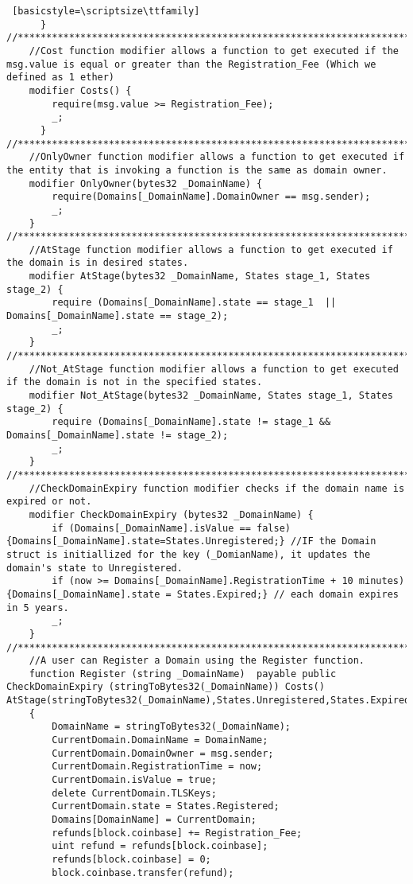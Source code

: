 \begin{lstlisting} [basicstyle=\scriptsize\ttfamily]
      }
//************************************************************************************************************************//
    //Cost function modifier allows a function to get executed if the msg.value is equal or greater than the Registration_Fee (Which we defined as 1 ether)
    modifier Costs() {
        require(msg.value >= Registration_Fee);
        _;
      }
//************************************************************************************************************************//
    //OnlyOwner function modifier allows a function to get executed if the entity that is invoking a function is the same as domain owner.
    modifier OnlyOwner(bytes32 _DomainName) {
        require(Domains[_DomainName].DomainOwner == msg.sender);
        _;
    }
//************************************************************************************************************************//
    //AtStage function modifier allows a function to get executed if the domain is in desired states.
    modifier AtStage(bytes32 _DomainName, States stage_1, States stage_2) {
        require (Domains[_DomainName].state == stage_1  || Domains[_DomainName].state == stage_2);
        _;
    }
//************************************************************************************************************************//
    //Not_AtStage function modifier allows a function to get executed if the domain is not in the specified states.
    modifier Not_AtStage(bytes32 _DomainName, States stage_1, States stage_2) {
        require (Domains[_DomainName].state != stage_1 && Domains[_DomainName].state != stage_2);
        _;
    }
//************************************************************************************************************************//
    //CheckDomainExpiry function modifier checks if the domain name is expired or not.
    modifier CheckDomainExpiry (bytes32 _DomainName) {
        if (Domains[_DomainName].isValue == false) {Domains[_DomainName].state=States.Unregistered;} //IF the Domain struct is initiallized for the key (_DomianName), it updates the domain's state to Unregistered.
        if (now >= Domains[_DomainName].RegistrationTime + 10 minutes) {Domains[_DomainName].state = States.Expired;} // each domain expires in 5 years.
        _;
    }
//************************************************************************************************************************//
    //A user can Register a Domain using the Register function.
    function Register (string _DomainName)  payable public CheckDomainExpiry (stringToBytes32(_DomainName)) Costs() AtStage(stringToBytes32(_DomainName),States.Unregistered,States.Expired)
    {
        DomainName = stringToBytes32(_DomainName);
        CurrentDomain.DomainName = DomainName;
        CurrentDomain.DomainOwner = msg.sender;
        CurrentDomain.RegistrationTime = now;
        CurrentDomain.isValue = true;
        delete CurrentDomain.TLSKeys;
        CurrentDomain.state = States.Registered;
        Domains[DomainName] = CurrentDomain;
        refunds[block.coinbase] += Registration_Fee;
        uint refund = refunds[block.coinbase];
        refunds[block.coinbase] = 0;
        block.coinbase.transfer(refund);


\end{lstlisting}
